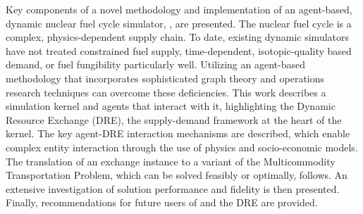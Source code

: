 Key components of a novel methodology and implementation of an agent-based,
dynamic nuclear fuel cycle simulator, \Cyclus, are presented. The nuclear fuel
cycle is a complex, physics-dependent supply chain. To date, existing dynamic
simulators have not treated constrained fuel supply, time-dependent,
isotopic-quality based demand, or fuel fungibility particularly well. Utilizing
an agent-based methodology that incorporates sophisticated graph theory and
operations research techniques can overcome these deficiencies. This work
describes a simulation kernel and agents that interact with it, highlighting the
Dynamic Resource Exchange (DRE), the supply-demand framework at the heart of the
kernel. The key agent-DRE interaction mechanisms are described, which enable
complex entity interaction through the use of physics and socio-economic
models. The translation of an exchange instance to a variant of the
Multicommodity Transportation Problem, which can be solved feasibly or
optimally, follows. An extensive investigation of solution performance and
fidelity is then presented. Finally, recommendations for future users of \Cyclus
and the DRE are provided.

